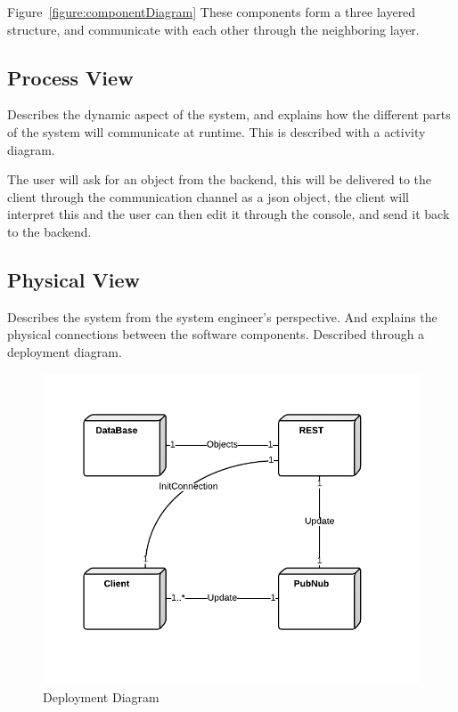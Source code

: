Figure~\ref{figure:componentDiagram} These components form a three layered structure, and communicate with each other through the neighboring layer.


\subsection{Process View}
Describes the dynamic aspect of the system, and explains how the different parts of the system will communicate at runtime. This is described with a activity diagram.

The user will ask for an object from the backend, this will be delivered to the client through the communication channel as a json object, the client will interpret this and the user can then edit it through the console, and send it back to the backend.



\subsection{Physical View}
Describes the system from the system engineer's perspective. And explains the physical connections between the software components. Described through a deployment diagram. 

\begin{figure}
\centering
\includegraphics[width=6in]{image/DeploymentDiagram.png}
\caption{Deployment Diagram}
\label{figure:deploymentDiagram}
\end{figure}

